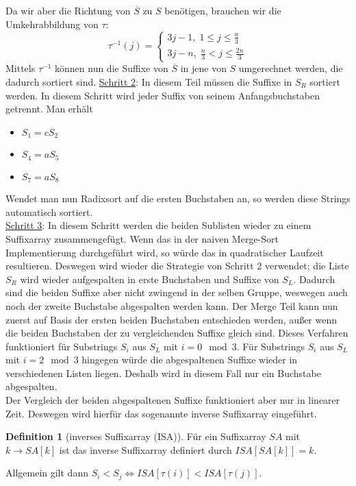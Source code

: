 \documentclass[a4paper, 12pt]{article}
\theoremstyle{plain}
\theoremstyle{definition}
\newtheorem{definition}[theorem]{Definition} %
\theoremstyle{lemma}
\theoremstyle{remark}
\theoremstyle{corollary}
\theoremstyle{example}
\begin{document}
	Da wir aber die Richtung von $\overline{S}$ zu $S$ benötigen, brauchen wir die Umkehrabbildung von $\tau$: \[\tau^{-1}(j) = \begin{cases}
		3j-1, \; 1 \leq j \leq \frac{n}{3}\\
		3j-n, \; \frac{n}{3} < j \leq \frac{2n}{3}
	\end{cases}\]
	Mittels $\tau^{-1}$ können nun die Suffixe von $\overline{S}$ in jene von $S$ umgerechnet werden, die dadurch sortiert sind.
	\underline{Schritt 2}: In diesem Teil müssen die Suffixe in $S_R$ sortiert werden. In diesem Schritt wird jeder Suffix von seinem Anfangsbuchstaben getrennt. Man erhält \begin{itemize}
		\item $S_1 = cS_2$
		\item $S_4 = aS_5$
		\item $S_7 = aS_8$
	\end{itemize}
	Wendet man nun Radixsort auf die ersten Buchstaben an, so werden diese Strings automatisch sortiert.\\
	\underline{Schritt 3}: In diesem Schritt werden die beiden Sublisten wieder zu einem Suffixarray zusammengefügt. Wenn das in der naiven Merge-Sort Implementierung durchgeführt wird, so würde das in quadratischer Laufzeit resultieren. Deswegen wird wieder die Strategie von Schritt 2 verwendet; die Liste $S_R$ wird wieder aufgespalten in erste Buchstaben und Suffixe von $S_L$. Dadurch sind die beiden Suffixe aber nicht zwingend in der selben Gruppe, weswegen auch noch der zweite Buchstabe abgespalten werden kann. Der Merge Teil kann nun zuerst auf Basis der ersten beiden Buchstaben entschieden werden, außer wenn die beiden Buchstaben der zu vergleichenden Suffixe gleich sind. Dieses Verfahren funktioniert für Substrings $S_i$ aus $S_L$ mit $i = 0 \mod 3$. Für Substrings $S_i$ aus $S_L$ mit $i = 2 \mod 3$ hingegen würde die abgespaltenen Suffixe wieder in verschiedenen Listen liegen. Deshalb wird in diesem Fall nur ein Buchstabe abgespalten.\\
	Der Vergleich der beiden abgespaltenen Suffixe funktioniert aber nur in linearer Zeit. Deswegen wird hierfür das sogenannte inverse Suffixarray eingeführt.
	\begin{definition}[inverses Suffixarray (ISA)]
		Für ein Suffixarray $SA$ mit $k \to SA[k]$ ist das inverse Suffixarray definiert durch $ISA[SA[k]] = k$.
	\end{definition}
	Allgemein gilt dann $S_i < S_j \Leftrightarrow ISA[\tau(i)] < ISA[\tau(j)]$.
\end{document}
